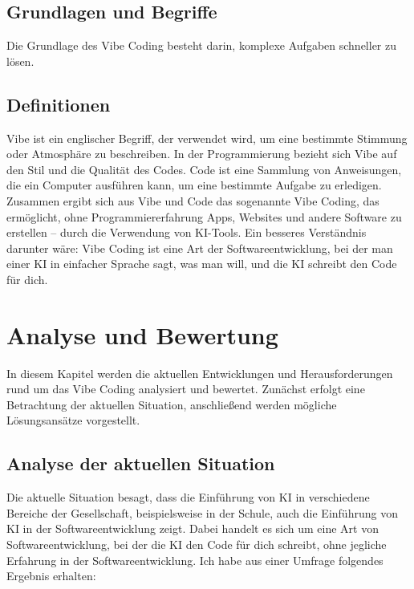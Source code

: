 \documentclass[paper=a4,fontsize=12pt,ngerman]{scrartcl}
\begin{document}
\subsection{Grundlagen und Begriffe}
Die Grundlage des Vibe Coding besteht darin, komplexe Aufgaben schneller zu lösen.

\subsection{Definitionen}
Vibe ist ein englischer Begriff, der verwendet wird, um eine bestimmte Stimmung oder Atmosphäre zu beschreiben.
In der Programmierung bezieht sich Vibe auf den Stil und die Qualität des Codes.
Code ist eine Sammlung von Anweisungen, die ein Computer ausführen kann, um eine bestimmte Aufgabe zu erledigen.
Zusammen ergibt sich aus Vibe und Code das sogenannte Vibe Coding, das ermöglicht,
ohne Programmiererfahrung Apps, Websites und andere Software zu erstellen – durch die Verwendung von KI-Tools. 
Ein besseres Verständnis darunter wäre:
Vibe Coding ist eine Art der Softwareentwicklung, bei der man einer KI in einfacher Sprache sagt, was man will, und die KI schreibt den Code für dich. \citep{Datacamp}

\clearpage
\section{Analyse und Bewertung}
In diesem Kapitel werden die aktuellen Entwicklungen und Herausforderungen rund um das Vibe Coding analysiert und bewertet. Zunächst erfolgt eine Betrachtung der aktuellen Situation, anschließend werden mögliche Lösungsansätze vorgestellt.

\subsection{Analyse der aktuellen Situation}
Die aktuelle Situation besagt, dass die Einführung von KI in verschiedene Bereiche der Gesellschaft, 
beispielsweise in der Schule, auch die Einführung von KI in der Softwareentwicklung zeigt. 
Dabei handelt es sich um eine Art von Softwareentwicklung, bei der die KI den Code für dich schreibt,
ohne jegliche Erfahrung in der Softwareentwicklung. Ich habe aus einer Umfrage folgendes Ergebnis erhalten: 
\end{document}
